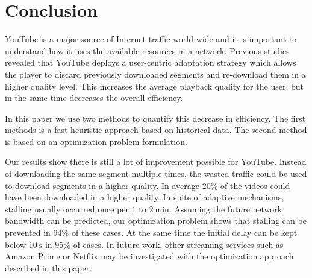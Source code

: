 
\section{Conclusion}
\label{sec:conclusion}

YouTube is a major source of Internet traffic world-wide and it is important to understand how it uses the available resources in a network.
Previous studies revealed that YouTube deploys a user-centric adaptation strategy which allows the player to discard previously downloaded segments and re-download them in a higher quality level.
This increases the average playback quality for the user, but in the same time decreases the overall efficiency.

In this paper we use two methods to quantify this decrease in efficiency.
The first methods is a fast heuristic approach based on historical data.
The second method is based on an optimization problem formulation.

Our results show there is still a lot of improvement possible for YouTube. Instead of downloading the same segment multiple times, the wasted traffic could be used to download segments in a higher quality. In average $20\%$ of the videos could have been downloaded in a higher quality. In spite of adaptive mechanisms, stalling usually occurred once per $1$ to $\SI{2}{\minute}$. Assuming the future network bandwidth can be predicted, our optimization problem shows that stalling can be prevented in $94\%$ of these cases. At the same time the initial delay can be kept below $\SI{10}{\second}$ in $95\%$ of cases. In future work, other streaming services such as Amazon Prime or Netflix may be investigated with the optimization approach described in this paper.
